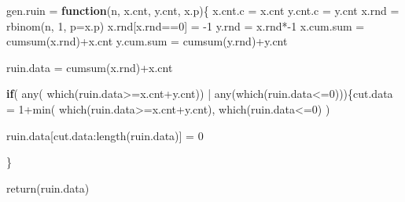 \documentclass[
]{article}
\newenvironment{Shaded}{\begin{snugshade}}{\end{snugshade}}
\newcommand{\AttributeTok}[1]{\textcolor[rgb]{0.77,0.63,0.00}{#1}}
\newcommand{\ControlFlowTok}[1]{\textcolor[rgb]{0.13,0.29,0.53}{\textbf{#1}}}
\newcommand{\DecValTok}[1]{\textcolor[rgb]{0.00,0.00,0.81}{#1}}
\newcommand{\FunctionTok}[1]{\textcolor[rgb]{0.00,0.00,0.00}{#1}}
\newcommand{\NormalTok}[1]{#1}
\newcommand{\OtherTok}[1]{\textcolor[rgb]{0.56,0.35,0.01}{#1}}
\newcommand{\SpecialCharTok}[1]{\textcolor[rgb]{0.00,0.00,0.00}{#1}}
\begin{document}
\begin{Shaded}
\begin{Highlighting}[]
\NormalTok{gen.ruin }\OtherTok{=} \ControlFlowTok{function}\NormalTok{(n, x.cnt, y.cnt, x.p)\{}
\NormalTok{  x.cnt.c }\OtherTok{=}\NormalTok{ x.cnt}
\NormalTok{  y.cnt.c }\OtherTok{=}\NormalTok{ y.cnt}
\NormalTok{  x.rnd }\OtherTok{=} \FunctionTok{rbinom}\NormalTok{(n, }\DecValTok{1}\NormalTok{, }\AttributeTok{p=}\NormalTok{x.p)}
\NormalTok{  x.rnd[x.rnd}\SpecialCharTok{==}\DecValTok{0}\NormalTok{] }\OtherTok{=} \SpecialCharTok{{-}}\DecValTok{1}
\NormalTok{  y.rnd }\OtherTok{=}\NormalTok{ x.rnd}\SpecialCharTok{*{-}}\DecValTok{1}
\NormalTok{  x.cum.sum }\OtherTok{=} \FunctionTok{cumsum}\NormalTok{(x.rnd)}\SpecialCharTok{+}\NormalTok{x.cnt}
\NormalTok{  y.cum.sum }\OtherTok{=} \FunctionTok{cumsum}\NormalTok{(y.rnd)}\SpecialCharTok{+}\NormalTok{y.cnt}
  
\NormalTok{  ruin.data }\OtherTok{=} \FunctionTok{cumsum}\NormalTok{(x.rnd)}\SpecialCharTok{+}\NormalTok{x.cnt}
  
  \ControlFlowTok{if}\NormalTok{( }\FunctionTok{any}\NormalTok{( }\FunctionTok{which}\NormalTok{(ruin.data}\SpecialCharTok{\textgreater{}=}\NormalTok{x.cnt}\SpecialCharTok{+}\NormalTok{y.cnt)) }\SpecialCharTok{|} \FunctionTok{any}\NormalTok{(}\FunctionTok{which}\NormalTok{(ruin.data}\SpecialCharTok{\textless{}=}\DecValTok{0}\NormalTok{)))\{cut.data }\OtherTok{=} \DecValTok{1}\SpecialCharTok{+}\FunctionTok{min}\NormalTok{( }\FunctionTok{which}\NormalTok{(ruin.data}\SpecialCharTok{\textgreater{}=}\NormalTok{x.cnt}\SpecialCharTok{+}\NormalTok{y.cnt), }\FunctionTok{which}\NormalTok{(ruin.data}\SpecialCharTok{\textless{}=}\DecValTok{0}\NormalTok{) )}
  
\NormalTok{  ruin.data[cut.data}\SpecialCharTok{:}\FunctionTok{length}\NormalTok{(ruin.data)] }\OtherTok{=} \DecValTok{0}
  
\NormalTok{  \}}
  
  \FunctionTok{return}\NormalTok{(ruin.data)}
  

\end{Highlighting}
\end{Shaded}
\end{document}
